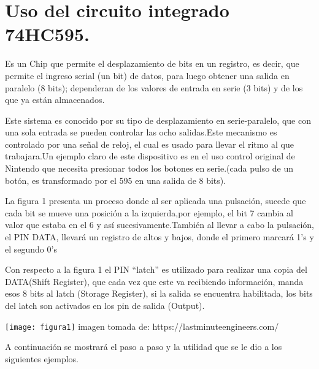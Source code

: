 \documentclass{article}
\begin{document}
\newpage
\section{Uso del circuito integrado 74HC595.}
\label{74HC595}


Es un Chip que permite el desplazamiento de bits en un registro, es decir, que permite el ingreso serial (un bit) de datos, para luego obtener una salida en paralelo (8 bits); dependeran de los valores de entrada en serie (3 bits) y de los que ya están almacenados.

Este sistema es conocido por su tipo de desplazamiento en serie-paralelo, que con una sola entrada se pueden controlar las ocho salidas.Este mecanismo es controlado por una señal de reloj, el cual es usado para llevar el ritmo al que trabajara.Un ejemplo claro de este dispositivo es en el uso control original de Nintendo que necesita presionar todos los botones en serie.(cada pulso de un botón, es transformado por el 595 en una salida de 8 bits).

La figura 1 presenta un proceso donde al ser aplicada una pulsación, sucede que cada bit se mueve una posición a la izquierda,por ejemplo, el bit 7 cambia al valor que estaba en el 6 y así sucesivamente.También al llevar a cabo la pulsación, el PIN DATA, llevará un registro de altos y bajos, donde el primero marcará 1’s y el segundo 0’s

Con respecto a la figura 1 el PIN “latch” es utilizado para realizar una copia del DATA(Shift Register), que cada vez que este va recibiendo información, manda esos 8 bits al latch (Storage Register), si la salida se encuentra habilitada, los bits del latch son activados en los pin de salida (Output).


\begin{center}
\texttt{[image: figura1]}
imagen tomada de: https://lastminuteengineers.com/

\end{center}
\newpage

A continuación se mostrará el paso a paso y la utilidad que se le dio a los siguientes ejemplos.\newline
\end{document}
